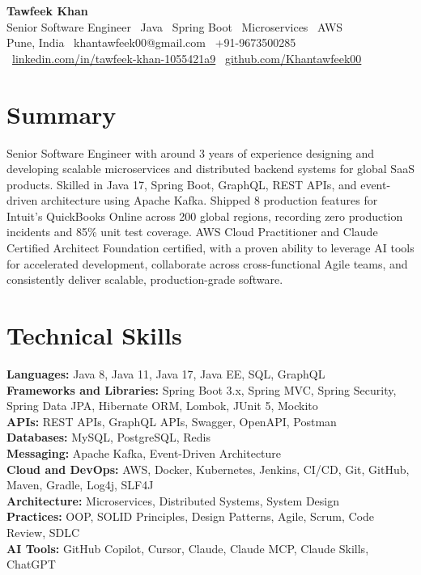\documentclass[10pt, letterpaper]{article}
\begin{document}
\begin{center}
    {\huge \textbf{Tawfeek Khan}} \\[2pt]
    {\large Senior Software Engineer \textbar\ Java \textbar\ Spring Boot \textbar\ Microservices \textbar\ AWS} \\[2pt]
    \small
    Pune, India \textbar\
    khantawfeek00@gmail.com \textbar\
    +91-9673500285 \textbar\
    \href{https://www.linkedin.com/in/tawfeek-khan-1055421a9/}{linkedin.com/in/tawfeek-khan-1055421a9} \textbar\
    \href{https://github.com/Khantawfeek00}{github.com/Khantawfeek00}
\end{center}

\section{Summary}
Senior Software Engineer with around 3 years of experience designing and developing scalable microservices and distributed backend systems for global SaaS products. Skilled in Java 17, Spring Boot, GraphQL, REST APIs, and event-driven architecture using Apache Kafka. Shipped 8 production features for Intuit's QuickBooks Online across 200 global regions, recording zero production incidents and 85\% unit test coverage. AWS Cloud Practitioner and Claude Certified Architect Foundation certified, with a proven ability to leverage AI tools for accelerated development, collaborate across cross-functional Agile teams, and consistently deliver scalable, production-grade software.

\section{Technical Skills}
\textbf{Languages:} Java 8, Java 11, Java 17, Java EE, SQL, GraphQL \\
\textbf{Frameworks and Libraries:} Spring Boot 3.x, Spring MVC, Spring Security, Spring Data JPA, Hibernate ORM, Lombok, JUnit 5, Mockito \\
\textbf{APIs:} REST APIs, GraphQL APIs, Swagger, OpenAPI, Postman \\
\textbf{Databases:} MySQL, PostgreSQL, Redis \\
\textbf{Messaging:} Apache Kafka, Event-Driven Architecture \\
\textbf{Cloud and DevOps:} AWS, Docker, Kubernetes, Jenkins, CI/CD, Git, GitHub, Maven, Gradle, Log4j, SLF4J \\
\textbf{Architecture:} Microservices, Distributed Systems, System Design \\
\textbf{Practices:} OOP, SOLID Principles, Design Patterns, Agile, Scrum, Code Review, SDLC \\
\textbf{AI Tools:} GitHub Copilot, Cursor, Claude, Claude MCP, Claude Skills, ChatGPT
\end{document}
